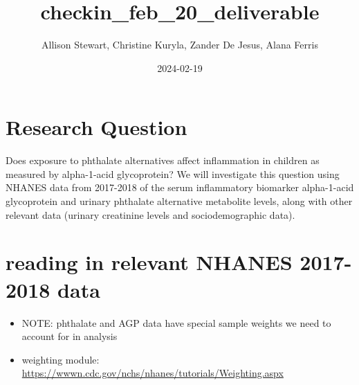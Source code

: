 \documentclass[
]{article}
\title{checkin\_feb\_20\_deliverable}
\author{Allison Stewart, Christine Kuryla, Zander De Jesus, Alana
Ferris}
\date{2024-02-19}
\providecommand{\tightlist}{%
  \setlength{\itemsep}{0pt}\setlength{\parskip}{0pt}}
\begin{document}
\maketitle

\hypertarget{research-question}{%
\section{Research Question}\label{research-question}}

Does exposure to phthalate alternatives affect inflammation in children
as measured by alpha-1-acid glycoprotein? We will investigate this
question using NHANES data from 2017-2018 of the serum inflammatory
biomarker alpha-1-acid glycoprotein and urinary phthalate alternative
metabolite levels, along with other relevant data (urinary creatinine
levels and sociodemographic data).

\hypertarget{reading-in-relevant-nhanes-2017-2018-data}{%
\section{reading in relevant NHANES 2017-2018
data}\label{reading-in-relevant-nhanes-2017-2018-data}}

\begin{itemize}
\tightlist
\item
  NOTE: phthalate and AGP data have special sample weights we need to
  account for in analysis
\item
  weighting module:
  \url{https://wwwn.cdc.gov/nchs/nhanes/tutorials/Weighting.aspx}
\end{itemize}
\end{document}
